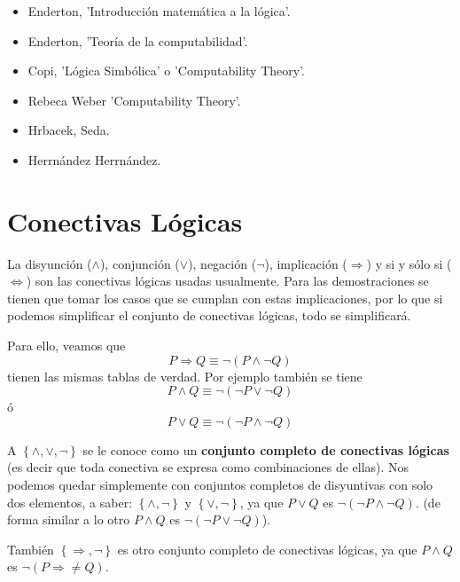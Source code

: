 \documentclass[12pt]{report}
\newcounter{it}
\theoremstyle{largebreak}
\begin{document}
    \begin{itemize}
        \item Enderton, 'Introducción matemática a la lógica'.
        \item  Enderton, 'Teoría de la computabilidad'.
        \item Copi, 'Lógica Simbólica' o 'Computability Theory'.
        \item Rebeca Weber 'Computability Theory'.
        \item Hrbacek, Seda.
        \item Herrnández Herrnández.
    \end{itemize}

    \section{Conectivas Lógicas}

    La disyunción ($\land$), conjunción ($\lor$), negación ($\neg$), implicación ($\Rightarrow$) y si y sólo si ($\iff$) son las conectivas lógicas usadas usualmente. Para las demostraciones se tienen que tomar los casos que se cumplan con estas implicaciones, por lo que si podemos simplificar el conjunto de conectivas lógicas, todo se simplificará.

    Para ello, veamos que
    \begin{equation*}
        P\Rightarrow Q \equiv \neg(P\land\neg Q)
    \end{equation*}
    tienen las mismas tablas de verdad. Por ejemplo también se tiene
    \begin{equation*}
        P\land Q\equiv \neg(\neg P\lor\neg Q)
    \end{equation*}
    ó
    \begin{equation*}
        P\lor Q\equiv\neg(\neg P\land\neg Q)
    \end{equation*}

    A $\left\{\land, \lor, \neg \right\}$ se le conoce como un \textbf{conjunto completo de conectivas lógicas} (es decir que toda conectiva se expresa como combinaciones de ellas). Nos podemos quedar simplemente con conjuntos completos de disyuntivas con solo dos elementos, a saber: $\left\{\land, \neg \right\}$ y $\left\{\lor, \neg \right\}$, ya que $P\lor Q$ es $\neg(\neg P\land \neg Q)$. (de forma similar a lo otro $P\land Q$ es $\neg(\neg P\lor \neg Q)$).

    También $\left\{\Rightarrow, \neg \right\}$ es otro conjunto completo de conectivas lógicas, ya que $P\land Q$ es $\neg(P\Rightarrow\neq Q)$.
\end{document}
